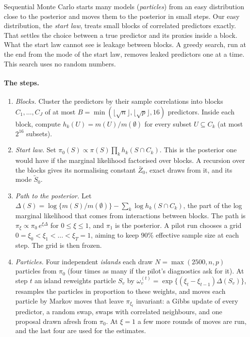 \documentclass[11pt]{article}
\newcommand{\tSz}{\tilde S_0}
\theoremstyle{plain}
\theoremstyle{definition}
\begin{document}
Sequential Monte Carlo starts many models (\emph{particles}) from an easy distribution close to the posterior and moves
them to the posterior in small steps. Our easy distribution, the \emph{start law}, treats small blocks of correlated
predictors exactly. That settles the choice between a true predictor and its proxies inside a block. What the start law
cannot see is leakage between blocks. A greedy search, run at the end from the mode of the start law, removes leaked
predictors one at a time. This search uses no random numbers.

\paragraph{The steps.}
\begin{enumerate}
  \item \emph{Blocks.} Cluster the predictors by their sample correlations into blocks $C_1,\dots,C_J$ of at most
    $B=\min(\lfloor\sqrt n\rfloor,\lfloor\sqrt p\rfloor,16)$ predictors. Inside each block, compute
    $h_k(U)=m(U)/m(\emptyset)$ for every subset $U\subseteq C_k$ (at most $2^{16}$ subsets).
  \item \emph{Start law.} Set $\pi_0(S)\propto\pi(S)\prod_{k}h_k(S\cap C_k)$. This is the posterior one would have if the
    marginal likelihood factorised over blocks. A recursion over the blocks gives its normalising constant $\bar Z_0$,
    exact draws from it, and its mode $\tSz$.
  \item \emph{Path to the posterior.} Let $\Delta(S)=\log\{m(S)/m(\emptyset)\}-\sum_k\log h_k(S\cap C_k)$, the part of the
    log marginal likelihood that comes from interactions between blocks. The path is
    $\pi_\xi\propto\pi_0\,e^{\xi\Delta}$ for $0\le\xi\le1$, and $\pi_1$ is the posterior. A pilot run chooses a grid
    $0=\xi_0<\xi_1<\dots<\xi_T=1$, aiming to keep $90\%$ effective sample size at each step. The grid is then frozen.
  \item \emph{Particles.} Four independent \emph{islands} each draw $N=\max(2500,n,p)$ particles from $\pi_0$ (four times
    as many if the pilot's diagnostics ask for it). At step $t$ an island reweights particle $S_v$ by
    $\omega^{(t)}_v=\exp\{(\xi_t-\xi_{t-1})\Delta(S_v)\}$, resamples the particles in proportion to these weights, and
    moves each particle by Markov moves that leave $\pi_{\xi_t}$ invariant: a Gibbs update of every predictor, a random
    swap, swaps with correlated neighbours, and one proposal drawn afresh from $\pi_0$. At $\xi=1$ a few more rounds of
    moves are run, and the last four are used for the estimates.

\end{enumerate}
\end{document}
